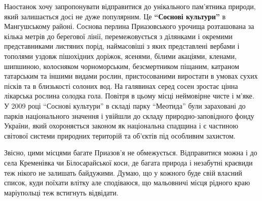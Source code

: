 Наостанок хочу запропонувати відправитися до унікального  пам'ятника природи,
який залишається досі не дуже популярним. Це \textbf{\enquote{Соснові культури}} в Мангушському
районі. Соснова перлина Приазовського урочища розташована за кілька метрів до
берегової лінії, перемежовується з ділянками і окремими представниками листяних
порід, наймасовіші з яких представлені вербами і тополями уздовж пішохідних
доріжок, ясенями, білими акаціями, кленами, шипшиною, колосняком чорноморським,
безсмертником піщаним, катраном татарським та іншими видами рослин,
пристосованими виростати в умовах сухих пісків та  в близькості солоних вод. На
галявинах серед сосен  зростає цінна лікарська рослина солодка гола. Повітря в
цьому місці неймовірне чисте і м'яке. У 2009 році \enquote{Соснові культури} в складі
парку \enquote{Меотида} були зараховані до парків національного значення і увійшли до
складу природно-заповідного фонду України, який охороняється законом як
національна спадщина і є частиною світової системи природних територій та
об'єктів під особливим захистом.

Звісно, цими місцями багате Приазов'я не обмежується. Відправитися можна і до
села Кременівка чи Білосарайської коси, де багата природа і незабутні краєвиди
теж нікого не залишать байдужими. Думаю, що у кожного буде свій власний список,
куди поїхати влітку але сподіваюся, що мальовничі місця рідного краю
маріупольці теж встигнуть відвідати.
